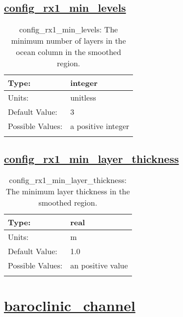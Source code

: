 \subsection[config\_rx1\_min\_levels]{\hyperref[sec:nm_tab_constrain_Haney_number]{config\_rx1\_min\_levels}}
\label{subsec:nm_sec_config_rx1_min_levels}
\begin{center}
\begin{longtable}{| p{2.0in} || p{4.0in} |}
    \hline
    Type: & integer \\
    \hline
    Units: & \si{unitless} \\
    \hline
    Default Value: & 3 \\
    \hline
    Possible Values: & a positive integer \\
    \hline
    \caption{config\_rx1\_min\_levels: The minimum number of layers in the ocean column in the smoothed region.}
\end{longtable}
\end{center}
\subsection[config\_rx1\_min\_layer\_thickness]{\hyperref[sec:nm_tab_constrain_Haney_number]{config\_rx1\_min\_layer\_thickness}}
\label{subsec:nm_sec_config_rx1_min_layer_thickness}
\begin{center}
\begin{longtable}{| p{2.0in} || p{4.0in} |}
    \hline
    Type: & real \\
    \hline
    Units: & \si{m} \\
    \hline
    Default Value: & 1.0 \\
    \hline
    Possible Values: & an positive value \\
    \hline
    \caption{config\_rx1\_min\_layer\_thickness: The minimum layer thickness in the smoothed region.}
\end{longtable}
\end{center}
\section[baroclinic\_channel]{\hyperref[sec:nm_tab_baroclinic_channel]{baroclinic\_channel}}
\label{sec:nm_sec_baroclinic_channel}
